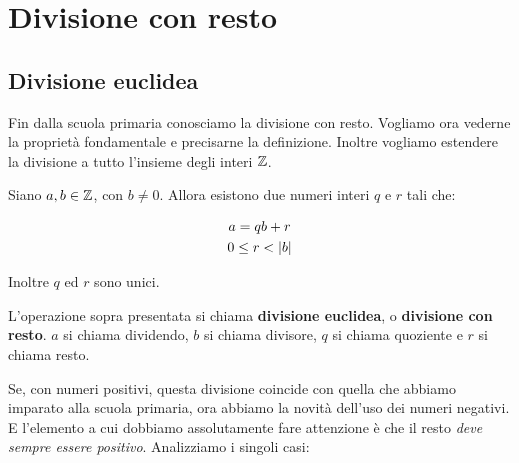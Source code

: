 \chapter{Divisione con resto}

\section{Divisione euclidea}

Fin dalla scuola primaria conosciamo la divisione con resto. Vogliamo ora vederne la proprietà fondamentale e precisarne la definizione. Inoltre vogliamo estendere la divisione a tutto l'insieme degli interi $ \mathbb{Z} $.

\begin{teorema}
Siano $a, b \in  \mathbb{Z} $, con $b \ne 0$. Allora esistono due numeri interi $q$ e $r$ tali che:

\begin{gather}
    a = qb + r \\
    0 \le r <  \lvert b \rvert 
\end{gather}

Inoltre $q$ ed $r$ sono unici.
\end{teorema}

\begin{definizione}
L'operazione sopra presentata si chiama \textbf{divisione euclidea}, o \textbf{divisione con resto}. $a$
si chiama dividendo, $b$ si chiama divisore, $q$ si chiama quoziente e $r$ si chiama resto.
\end{definizione}

Se, con numeri positivi, questa divisione coincide con quella che abbiamo imparato alla scuola primaria, ora abbiamo la novità dell'uso dei numeri negativi. E l'elemento a cui dobbiamo assolutamente fare attenzione è che il resto \emph{deve sempre essere positivo}. Analizziamo i singoli casi:

